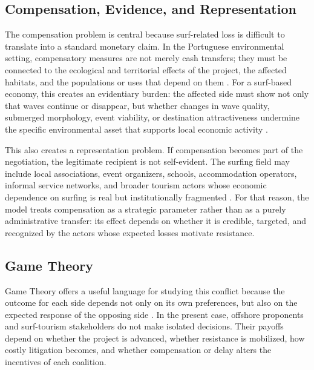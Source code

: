 \documentclass[final,times,authoryear]{elsarticle}
\begin{document}
\subsection{Compensation, Evidence, and Representation}

The compensation problem is central because surf-related loss is difficult to translate into a standard monetary claim. In the Portuguese environmental setting, compensatory measures are not merely cash transfers; they must be connected to the ecological and territorial effects of the project, the affected habitats, and the populations or uses that depend on them \citep{portuguese_dl_140_99}. For a surf-based economy, this creates an evidentiary burden: the affected side must show not only that waves continue or disappear, but whether changes in wave quality, submerged morphology, event viability, or destination attractiveness undermine the specific environmental asset that supports local economic activity \citep{scarfe_surfing_review_2009,corne_surfing_development_2009}.

This also creates a representation problem. If compensation becomes part of the negotiation, the legitimate recipient is not self-evident. The surfing field may include local associations, event organizers, schools, accommodation operators, informal service networks, and broader tourism actors whose economic dependence on surfing is real but institutionally fragmented \citep{cm_peniche_surf_sustainability_2017,gonzalez_peniche_2025}. For that reason, the model treats compensation as a strategic parameter rather than as a purely administrative transfer: its effect depends on whether it is credible, targeted, and recognized by the actors whose expected losses motivate resistance.

\subsection{Game Theory}

Game Theory offers a useful language for studying this conflict because the outcome for each side depends not only on its own preferences, but also on the expected response of the opposing side \citep{pianezzer2023,gillman2019}. In the present case, offshore proponents and surf-tourism stakeholders do not make isolated decisions. Their payoffs depend on whether the project is advanced, whether resistance is mobilized, how costly litigation becomes, and whether compensation or delay alters the incentives of each coalition.
\end{document}
